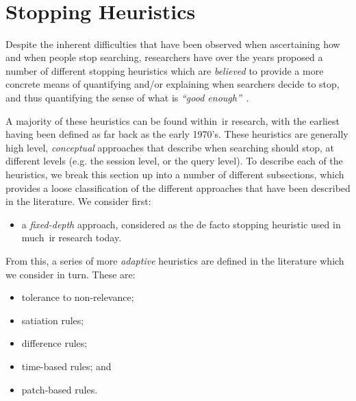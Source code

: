 ~\cite{wu2014information_scent}\\
~\cite{dostert2009satisficing}\\
~\cite{toms2009predicting_stopping}\\
~\cite{zach2005enough_is_enough}\\
~\cite{wu2014stopping_query_abandonment}\\
~\cite{marchionini1995information_seeking}


\section{Stopping Heuristics}\label{sec:stopping:heuristics}
Despite the inherent difficulties that have been observed when ascertaining how and when people stop searching, researchers have over the years proposed a number of different stopping heuristics which are \emph{believed} to provide a more concrete means of quantifying and/or explaining when searchers decide to stop, and thus quantifying the sense of what is \emph{``good enough''}~\citep{wu2014information_scent}.

A majority of these heuristics can be found within~\gls{ir} research, with the earliest having been defined as far back as the early 1970's. These heuristics are generally high level, \emph{conceptual} approaches that describe when searching should stop, at different levels (e.g. the session level, or the query level). To describe each of the heuristics, we break this section up into a number of different subsections, which provides a loose classification of the different approaches that have been described in the literature. We consider first:

\begin{itemize}
    
    \item{a \emph{fixed-depth} approach, considered as the de facto stopping heuristic used in much~\gls{ir} research today.}
    
\end{itemize}

From this, a series of more \emph{adaptive} heuristics are defined in the literature which we consider in turn. These are:

\begin{itemize}
    \item{tolerance to non-relevance;}
    \item{satiation rules;}
    \item{difference rules;}
    \item{time-based rules; and}
    \item{patch-based rules.}
\end{itemize}

